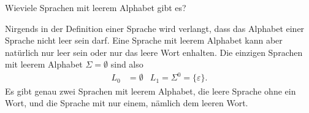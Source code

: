 Wieviele Sprachen mit leerem Alphabet gibt es?


\begin{loesung}
Nirgends in der Definition einer Sprache wird verlangt, dass das
Alphabet einer Sprache nicht leer sein darf. Eine Sprache mit leerem
Alphabet kann aber natürlich nur leer sein oder nur das leere Wort
enhalten. Die einzigen Sprachen mit leerem Alphabet $\Sigma=\emptyset$
sind also
\begin{align*}
L_0&=\emptyset& L_1=\Sigma^0=\{\varepsilon\}.
\end{align*}
Es gibt genau zwei Sprachen mit leerem Alphabet, die leere Sprache ohne
ein Wort, und die Sprache mit nur einem, nämlich dem leeren Wort.
\end{loesung}
